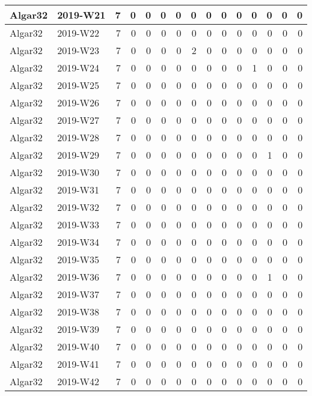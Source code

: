 \documentclass[]{book}
\begin{document}
\begin{table}
\begin{tabular}[t]{l|l|r|r|r|r|r|r|r|r|r|r|r|r|r}
\hline
Algar32 & 2019-W21 & 7 & 0 & 0 & 0 & 0 & 0 & 0 & 0 & 0 & 0 & 0 & 0 & 0\\
\hline
Algar32 & 2019-W22 & 7 & 0 & 0 & 0 & 0 & 0 & 0 & 0 & 0 & 0 & 0 & 0 & 0\\
\hline
Algar32 & 2019-W23 & 7 & 0 & 0 & 0 & 0 & 2 & 0 & 0 & 0 & 0 & 0 & 0 & 0\\
\hline
Algar32 & 2019-W24 & 7 & 0 & 0 & 0 & 0 & 0 & 0 & 0 & 0 & 1 & 0 & 0 & 0\\
\hline
Algar32 & 2019-W25 & 7 & 0 & 0 & 0 & 0 & 0 & 0 & 0 & 0 & 0 & 0 & 0 & 0\\
\hline
Algar32 & 2019-W26 & 7 & 0 & 0 & 0 & 0 & 0 & 0 & 0 & 0 & 0 & 0 & 0 & 0\\
\hline
Algar32 & 2019-W27 & 7 & 0 & 0 & 0 & 0 & 0 & 0 & 0 & 0 & 0 & 0 & 0 & 0\\
\hline
Algar32 & 2019-W28 & 7 & 0 & 0 & 0 & 0 & 0 & 0 & 0 & 0 & 0 & 0 & 0 & 0\\
\hline
Algar32 & 2019-W29 & 7 & 0 & 0 & 0 & 0 & 0 & 0 & 0 & 0 & 0 & 1 & 0 & 0\\
\hline
Algar32 & 2019-W30 & 7 & 0 & 0 & 0 & 0 & 0 & 0 & 0 & 0 & 0 & 0 & 0 & 0\\
\hline
Algar32 & 2019-W31 & 7 & 0 & 0 & 0 & 0 & 0 & 0 & 0 & 0 & 0 & 0 & 0 & 0\\
\hline
Algar32 & 2019-W32 & 7 & 0 & 0 & 0 & 0 & 0 & 0 & 0 & 0 & 0 & 0 & 0 & 0\\
\hline
Algar32 & 2019-W33 & 7 & 0 & 0 & 0 & 0 & 0 & 0 & 0 & 0 & 0 & 0 & 0 & 0\\
\hline
Algar32 & 2019-W34 & 7 & 0 & 0 & 0 & 0 & 0 & 0 & 0 & 0 & 0 & 0 & 0 & 0\\
\hline
Algar32 & 2019-W35 & 7 & 0 & 0 & 0 & 0 & 0 & 0 & 0 & 0 & 0 & 0 & 0 & 0\\
\hline
Algar32 & 2019-W36 & 7 & 0 & 0 & 0 & 0 & 0 & 0 & 0 & 0 & 0 & 1 & 0 & 0\\
\hline
Algar32 & 2019-W37 & 7 & 0 & 0 & 0 & 0 & 0 & 0 & 0 & 0 & 0 & 0 & 0 & 0\\
\hline
Algar32 & 2019-W38 & 7 & 0 & 0 & 0 & 0 & 0 & 0 & 0 & 0 & 0 & 0 & 0 & 0\\
\hline
Algar32 & 2019-W39 & 7 & 0 & 0 & 0 & 0 & 0 & 0 & 0 & 0 & 0 & 0 & 0 & 0\\
\hline
Algar32 & 2019-W40 & 7 & 0 & 0 & 0 & 0 & 0 & 0 & 0 & 0 & 0 & 0 & 0 & 0\\
\hline
Algar32 & 2019-W41 & 7 & 0 & 0 & 0 & 0 & 0 & 0 & 0 & 0 & 0 & 0 & 0 & 0\\
\hline
Algar32 & 2019-W42 & 7 & 0 & 0 & 0 & 0 & 0 & 0 & 0 & 0 & 0 & 0 & 0 & 0\\

\end{tabular}
\end{table}
\end{document}
